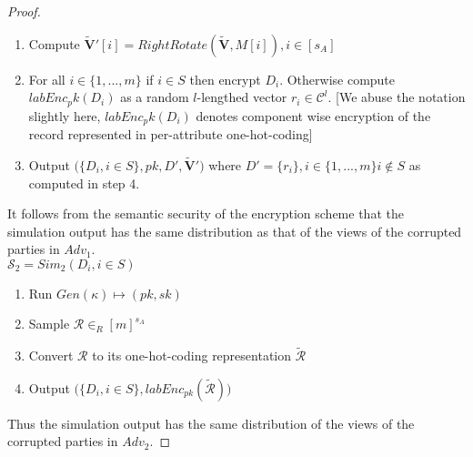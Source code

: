 \begin{proof}
\begin{enumerate}
\item Compute $\mathbf{\tilde{V}}'[i]=RightRotate(\mathbf{\tilde{V}},M[i]), i \in [s_A]$
\item For all $i \in \{1,...,m\}$ if $i \in S$ then encrypt $D_i$. 
Otherwise compute $labEnc_pk(D_i)$ as a random $l$-lengthed vector $r_i \in \mathcal{C}^l$. [We abuse the notation slightly here, $labEnc_pk(D_i)$ denotes component wise encryption of the record represented in per-attribute one-hot-coding]
\item Output $\Big(\{D_i, i \in S\},pk,D',\mathbf{\tilde{V}}' \Big)$ where $D'=\{r_i\},i \in \{1,...,m\} i \not \in S$ as computed in step 4.
\end{enumerate}
It follows from the semantic security of the encryption scheme that the simulation
output has the same distribution as that of the views of the corrupted parties in $Adv_1$.\\
$\mathcal{S}_2=Sim_2(D_i, i \in S)$
\begin{enumerate}\item Run $Gen(\kappa)\mapsto (pk,sk)$ \item Sample $\mathcal{R} \in_R [m]^{s_A}$
\item Convert $\mathcal{R}$ to its one-hot-coding representation $\tilde{\mathcal{R}}$
\item Output $\Big(\{D_i, i \in S\},labEnc_{pk}(\tilde{\mathcal{R}}) \Big)$
\end{enumerate}
Thus the simulation output has the same distribution of the
views of the corrupted parties in $Adv_2$. 


\end{proof}
